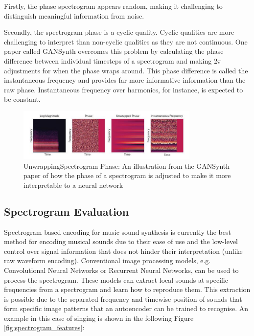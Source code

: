 Firstly, the phase spectrogram appears random, making it challenging to distinguish meaningful information from noise.

Secondly, the spectrogram phase is a cyclic quality. Cyclic qualities are more challenging to interpret than non-cyclic qualities as they are not continuous. One paper called GANSynth\cite{GANSynth} overcomes this problem by calculating the phase difference between individual timesteps of a spectrogram and making $2\pi$  adjustments for when the phase wraps around. This phase difference is called the instantaneous frequency and provides far more informative information than the raw phase. Instantaneous frequency over harmonics, for instance, is expected to be constant.

\begin{figure}[H]
    \centering
    \includegraphics[width=0.8\textwidth]{literature_review/PhaseAdjustment.png}
    \caption{UnwrappingSpectrogram Phase: An illustration from the GANSynth paper of how the phase of a spectrogram is adjusted to make it more interpretable to a neural network\cite{GANSynth}}
    \label{fig:phase_unwrapping}
\end{figure}

\subsection{Spectrogram Evaluation}

Spectrogram based encoding for music sound synthesis is currently the best method for encoding musical sounds due to their ease of use and the low-level control over signal information that does not hinder their interpretation (unlike raw waveform encoding). Conventional image processing models, e.g. Convolutional Neural Networks or Recurrent Neural Networks, can be used to process the spectrogram. These models can extract local sounds at specific frequencies from a spectrogram and learn how to reproduce them. This extraction is possible due to the separated frequency and timewise position of sounds that form specific image patterns that an autoencoder can be trained to recognise. An example in this case of singing is shown in the following Figure \ref{fig:spectrogram_features}:

